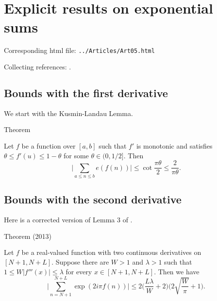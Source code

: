 \chapter{   Explicit results on exponential sums}

Corresponding html file: \texttt{../Articles/Art05.html}










Collecting references:
\cite{Daboussi-Rivat*01}.



 
 


\par 
\section{Bounds with the first derivative}


We start with the Kusmin-Landau Lemma.
\par 
\begin{thm}{Theorem}

    Let $f$ be a function over $[a, b]$ such that $f'$ is monotonic
    and satisfies $\theta \le f'(u)\le 1-\theta$ for some $\theta
    \in(0,1/2]$. Then
    $$
    \biggl|\sum_{a\le n\le b} e(f(n))\biggr|
    \le
    \cot\frac{\pi\theta}{2}\le \frac{2}{\pi \theta}.
    $$
\end{thm}



\par 
\section{Bounds with the second derivative}


  Here is a corrected version of Lemma 3 of
  \cite{Cheng-Graham*04}.
\par 
\begin{thm}{Theorem (2013)}

  Let $f$ be a real-valued function with two continuous derivatives
  on $[N+1, N+L]$. Suppose there are $W > 1$ and $\lambda > 1$ such
  that $1 \le W |f'''(x)| \le \lambda$ for every $x\in [N+1,
  N+L]$. Then we have
  $$
  \biggl|\sum_{n= N+1}^{N+L}
  \exp( 2i\pi f(n)) \biggr|
  \le 2\biggl(\frac{L \lambda}{W} +2\biggr)
  \biggl(2\sqrt{\frac{W}{\pi}} + 1\biggr).
  $$
\end{thm}



